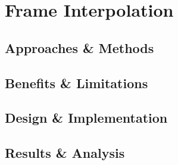\chapter{Frame Interpolation}
\label{chapterlabel6}
\section{Approaches \& Methods}
\section{Benefits \& Limitations}
\section{Design \& Implementation}
\section{Results \& Analysis}
